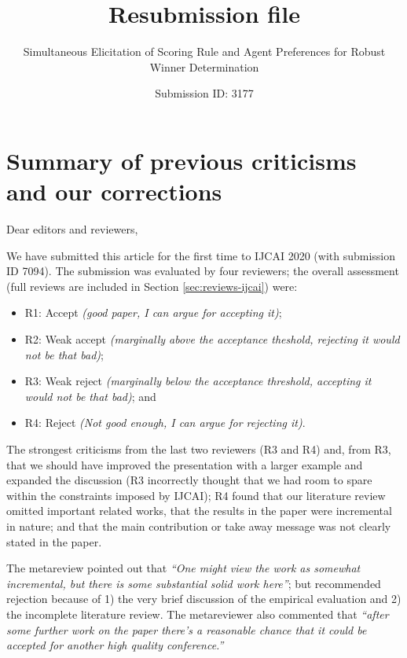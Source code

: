 \documentclass[version=3.21, pagesize, twoside=off, bibliography=totoc, DIV=calc, fontsize=12pt, a4paper]{scrartcl}
\title{Resubmission file}
\subtitle{Simultaneous Elicitation of Scoring Rule and Agent Preferences for Robust Winner Determination}
\author{Submission ID: 3177}
\date{}
\begin{document}
\maketitle

\tableofcontents

\section{Summary of previous criticisms and our corrections}

Dear editors and reviewers,

\medskip
We have submitted this article for the first time to IJCAI 2020 (with submission ID 7094). The submission was evaluated by four reviewers; the overall assessment (full reviews are included in Section \ref{sec:reviews-ijcai}) were: 
\begin{itemize}
\item R1: Accept {\em (good paper, I can argue for accepting it)};
\item R2: Weak accept {\em (marginally above the acceptance theshold, rejecting it would not be that bad)};
\item R3: Weak reject {\em (marginally below the acceptance threshold, accepting it would not be that bad)}; and
\item R4:  Reject {\em (Not good enough, I can argue for rejecting it)}.
\end{itemize}

The strongest criticisms from the last two reviewers (R3 and R4) and, from R3, that we should have improved the presentation with a larger example and expanded the discussion (R3 incorrectly thought that we had room to spare within the constraints imposed by IJCAI);  R4 found that our literature review omitted important related works, that the results in the paper were incremental in nature; and that the main contribution or take away message was not clearly stated in the paper. 

The metareview pointed out that {\em “One might view the work as somewhat incremental, but there is some substantial solid work here”}; but recommended rejection because of 1) the very brief discussion of the empirical evaluation and 2) the incomplete literature review. The metareviewer also commented that {\em “after some further work on the paper there's a reasonable chance that it could be accepted for another high quality conference.”}
\end{document}
